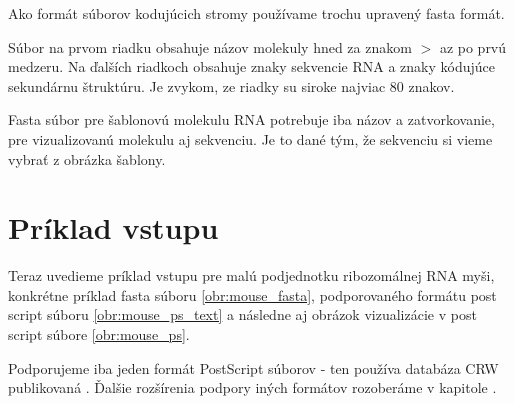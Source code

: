 Ako formát súborov kodujúcich stromy používame trochu upravený fasta formát.

Súbor na prvom riadku obsahuje názov molekuly hned za znakom $>$ az po prvú medzeru.
Na ďalších riadkoch obsahuje znaky sekvencie RNA a znaky kódujúce sekundárnu štruktúru.
Je zvykom, ze riadky su siroke najviac 80 znakov.

Fasta súbor pre šablonovú molekulu RNA potrebuje iba názov a zatvorkovanie, pre
vizualizovanú molekulu aj sekvenciu. Je to dané tým, že sekvenciu si vieme vybrať z obrázka šablony.

\section{Príklad vstupu}

Teraz uvedieme príklad vstupu pre malú podjednotku ribozomálnej RNA myši, konkrétne príklad
fasta súboru \ref{obr:mouse_fasta}, podporovaného formátu post script súboru \ref{obr:mouse_ps_text}
a následne aj obrázok vizualizácie v post script súbore \ref{obr:mouse_ps}.

\begin{pozn}
  Podporujeme iba jeden formát PostScript súborov - ten používa databáza CRW publikovaná \citet{CRW}.
  Ďalšie rozšírenia podpory iných formátov rozoberáme v kapitole .
\end{pozn}

